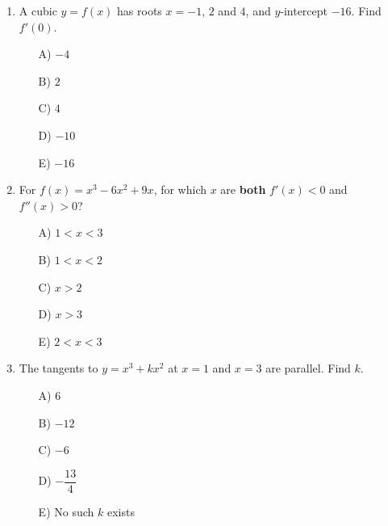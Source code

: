 \documentclass[11pt,a4paper]{article}
\newlength{\ipadheight}
\renewcommand{\ans}[1]{%
  \par\noindent
  \begin{minipage}[t][\ipadheight][t]{\linewidth}%
    \raggedleft\vspace*{\fill}%
    {\fontsize{4}{5}\selectfont\color{black!22}\rotatebox{180}{Ans:~#1}}%
  \end{minipage}%
  \par\vspace{4pt}}
\renewcommand{\method}[1]{}
\renewcommand{\inv}[1]{}
\begin{document}
\begin{enumerate}
\needspace{11cm}
\item A cubic $y=f(x)$ has roots $x=-1$, $2$ and $4$, and $y$-intercept $-16$. Find $f'(0)$.
\begin{itemize}
\item[A)] $-4$
\item[B)] $2$
\item[C)] $4$
\item[D)] $-10$
\item[E)] $-16$
\end{itemize}

\ans{A) $-4$}
\method{Let $f=k(x+1)(x-2)(x-4)$. Then $f(0)=k(1)(-2)(-4)=8k=-16$, so $k=-2$ and $f=-2x^3+10x^2-4x-16$. Hence $f'(x)=-6x^2+20x-4$ and $f'(0)=-4$. Decoys: B assumes $k=1$, giving $f'(0)=2$; C uses the factors $(x-1)(x+2)(x+4)$, which force $k=2$ and $f'(0)=4$; D takes $k$ times the sum of the roots, $-2(5)=-10$; E gives $f(0)=-16$.}
\inv{Show that $f'(-1)=k(-1-2)(-1-4)=-30$ without expanding, by taking the chord gradient $\dfrac{f(x)-f(-1)}{x+1}$ and letting $x\to-1$. Generalise to $f'(p)$ at any root $p$.}

\needspace{11cm}
\item For $f(x)=x^3-6x^2+9x$, for which $x$ are \textbf{both} $f'(x)<0$ and $f''(x)>0$?
\begin{itemize}
\item[A)] $1<x<3$
\item[B)] $1<x<2$
\item[C)] $x>2$
\item[D)] $x>3$
\item[E)] $2<x<3$
\end{itemize}

\ans{E) $2<x<3$}
\method{$f'=3x^2-12x+9=3(x-1)(x-3)<0$ exactly on $1<x<3$, and $f''=6x-12>0$ exactly for $x>2$. Both hold on $2<x<3$. Decoys: A ignores $f''$; B reverses the sign of $f''$, giving $1<x<2$; C ignores $f'$; D reverses the sign of $f'$, giving $x>3$.}
\inv{On $(2,3)$ the curve is falling but its gradient is increasing. Where is the gradient most negative, and what is that value?}

\needspace{11cm}
\item The tangents to $y=x^3+kx^2$ at $x=1$ and $x=3$ are parallel. Find $k$.
\begin{itemize}
\item[A)] $6$
\item[B)] $-12$
\item[C)] $-6$
\item[D)] $-\dfrac{13}{4}$
\item[E)] No such $k$ exists
\end{itemize}


\end{enumerate}
\end{document}
